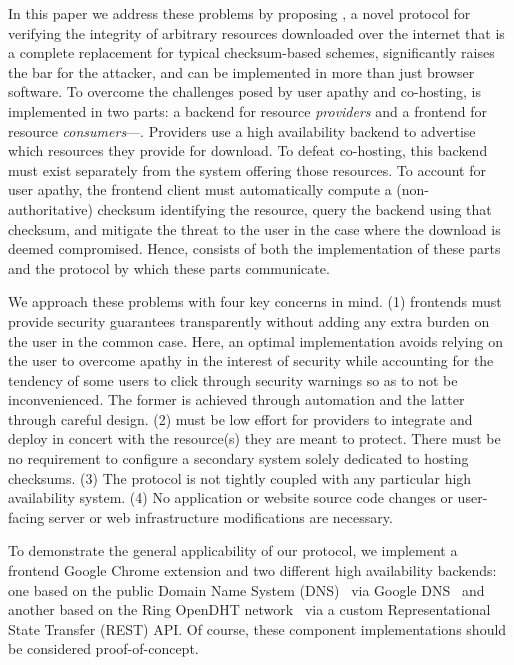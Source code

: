 In this paper we address these problems by proposing \SYSTEM{}, a novel protocol
for verifying the integrity of arbitrary resources downloaded over the internet
that is a complete replacement for typical checksum-based schemes, significantly
raises the bar for the attacker, and can be implemented in more than just
browser software. To overcome the challenges posed by user apathy and
co-hosting, \SYSTEM{} is implemented in two parts: a backend for resource
\emph{providers} and a frontend for resource \emph{consumers}---. Providers use a high availability backend to advertise which resources
they provide for download. To defeat co-hosting, this backend must exist
separately from the system offering those resources. To account for user apathy,
the frontend client must automatically compute a (non-authoritative) checksum
identifying the resource, query the backend using that checksum, and mitigate
the threat to the user in the case where the download is deemed compromised.
Hence, \SYSTEM{} consists of both the implementation of these parts and the
protocol by which these parts communicate.

We approach these problems with four key concerns in mind. (1) \SYSTEM{}
frontends must provide security guarantees transparently without adding any
extra burden on the user in the common case. Here, an optimal implementation
avoids relying on the user to overcome apathy in the interest of security while
accounting for the tendency of some users to click through security warnings so
as to not be inconvenienced. The former is achieved through automation and the
latter through careful design. (2) \SYSTEM{} must be low effort for providers to
integrate and deploy in concert with the resource(s) they are meant to protect.
There must be no requirement to configure a secondary system solely dedicated to
hosting checksums. (3) The protocol is not tightly coupled with any particular
high availability system. (4) No application or website source code changes or
user-facing server or web infrastructure modifications are necessary.

To demonstrate the general applicability of our protocol, we implement a
frontend Google Chrome extension and two different high availability backends:
one based on the public Domain Name System (DNS)~\cite{DNS1, DNS2} via Google
DNS~\cite{GoogleDNS} and another based on the Ring OpenDHT
network~\cite{OpenDHT, savoirfairelinux} via a custom Representational State
Transfer (REST) API. Of course, these \SYSTEM{} component implementations should
be considered proof-of-concept.

